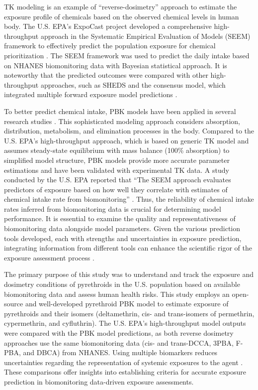 \documentclass[toxics,article,submit,pdftex,moreauthors]{Definitions/mdpi}
\begin{document}
TK modeling is an example of ``reverse-dosimetry'' approach to
estimate the exposure profile of chemicals
\citep{egeghy2011assessment, lin2023reconstructing} based on the
observed chemical levels in human body. The U.S. EPA's ExpoCast
project developed a comprehensive high-throughput approach in the
Systematic Empirical Evaluation of Models (SEEM) framework to
effectively predict the population exposure for chemical prioritization
\citep{wambaugh2013high, stanfield2022bayesian}. The SEEM framework was
used to predict the daily intake based on NHANES biomonitoring data with
Bayesian statistical approach. 
It is noteworthy that the predicted outcomes were compared with other high-throughput
approaches, such as SHEDS \citep{isaacs2014sheds} and the consensus
model, which integrated multiple forward exposure model predictions
\citep{ring2018consensus}.

To better predict chemical intake, PBK models
have been applied in several research studies \citep{tan2006use, allen2007use,
lyons2008computational, tornero2012pharmacokinetic, moreau2017using}. This
sophisticated modeling approach considers absorption, distribution, metabolism,
and elimination processes in the body. Compared to the U.S. EPA's
high-throughput approach, which is based on generic TK model and assumes
steady-state equilibrium with mass balance (100\% absorption) to simplified
model structure, PBK models provide more accurate parameter estimations and
have been validated with experimental TK data. A study conducted by the U.S.
EPA reported that ``The SEEM approach evaluates predictors of exposure based on
how well they correlate with estimates of chemical intake rate from
biomonitoring'' \citep{ring2018consensus}. Thus, the reliability of chemical
intake rates inferred from biomonitoring data is crucial for determining model
performance. It is essential to examine the quality and
representativeness of biomonitoring data alongside model parameters. Given the various prediction
tools developed, each with strengths and uncertainties in exposure prediction,
integrating information from different tools can enhance the scientific
rigor of the exposure assessment process \citep{moreau2017using}.

The primary purpose of this study was to understand and track the
exposure and dosimetry conditions of pyrethroids in the U.S. population
based on available biomonitoring data and assess human health risks.
This study employs an open-source and well-developed pyrethroid PBK
model to estimate exposure of pyrethroids and their isomers
(deltamethrin, cis- and trans-isomers of permethrin, cypermethrin, and
cyfluthrin). The U.S. EPA's high-throughput model outputs were compared
with the PBK model predictions, as both reverse dosimetry approaches use
the same biomonitoring data (cis- and trans-DCCA, 3PBA, F-PBA, and DBCA)
from NHANES. Using multiple biomarkers reduces uncertainties regarding
the representation of systemic exposures to the agent
\citep{lin2023reconstructing}. These comparisons offer insights into
establishing criteria for accurate exposure prediction in biomonitoring
data-driven exposure assessments.
\end{document}

